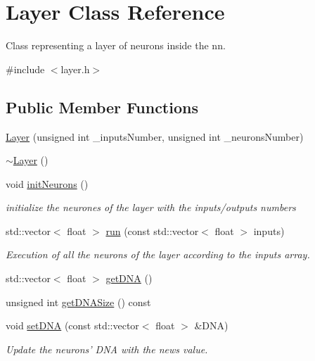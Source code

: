 \hypertarget{class_layer}{\section{Layer Class Reference}
\label{class_layer}
}


Class representing a layer of neurons inside the nn.  




{\ttfamily \#include $<$layer.\-h$>$}

\subsection*{Public Member Functions}
\begin{DoxyCompactItemize}
\item 
\hyperlink{class_layer_a16d6a7a3cff2e9e489186400a9d0f4f2}{Layer} (unsigned int \-\_\-inputs\-Number, unsigned int \-\_\-neurons\-Number)
\item 
\hyperlink{class_layer_a1b1ba4804451dfe6cc357194e42762ae}{$\sim$\-Layer} ()
\item 
void \hyperlink{class_layer_a08ee50fd54abe23d9fc94551c7b4be3f}{init\-Neurons} ()
\begin{DoxyCompactList}\small\item\em initialize the neurones of the layer with the inputs/outputs numbers \end{DoxyCompactList}\item 
std\-::vector$<$ float $>$ \hyperlink{class_layer_a33387425a6f32b455bdca87496a891c9}{run} (const std\-::vector$<$ float $>$ inputs)
\begin{DoxyCompactList}\small\item\em Execution of all the neurons of the layer according to the inputs array. \end{DoxyCompactList}\item 
std\-::vector$<$ float $>$ \hyperlink{class_layer_a18d9fa45eb9ff61f5d5bb9c74179bf30}{get\-D\-N\-A} ()
\item 
unsigned int \hyperlink{class_layer_a01093e904ef7331b99fccc9abe1174aa}{get\-D\-N\-A\-Size} () const 
\item 
void \hyperlink{class_layer_acd14a68865522c3e63a0dab87dd3a100}{set\-D\-N\-A} (const std\-::vector$<$ float $>$ \&D\-N\-A)
\begin{DoxyCompactList}\small\item\em Update the neurons' D\-N\-A with the news value. \end{DoxyCompactList}\end{DoxyCompactItemize}


